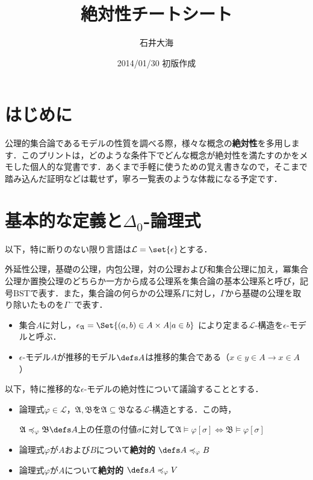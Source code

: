 \documentclass[xelatex,a4j,jadriver=standard]{bxjsarticle}
\title{絶対性チートシート}
\author{石井大海}
\date{2014/01/30 初版作成}
\newcommand*{\BST}{\mathrm{BST}}
\begin{document}
\maketitle

\section{はじめに}
公理的集合論であるモデルの性質を調べる際，様々な概念の{\bfseries 絶対性}を多用します．このプリントは，どのような条件下でどんな概念が絶対性を満たすのかをメモした個人的な覚書です．あくまで手軽に使うための覚え書きなので，そこまで踏み込んだ証明などは載せず，寧ろ一覧表のような体裁になる予定です．

\section{基本的な定義と$\Delta_0$-論理式}
以下，特に断りのない限り言語は$\mathcal{L} = \set{\epsilon}$とする．

\begin{definition}
 外延性公理，基礎の公理，内包公理，対の公理および和集合公理に加え，冪集合公理か置換公理のどちらか一方から成る公理系を集合論の基本公理系と呼び，記号$\BST$で表す．また，集合論の何らかの公理系$\Gamma$に対し，$\Gamma$から基礎の公理を取り除いたものを$\Gamma^-$で表す．
\end{definition}

\begin{definition}
\begin{itemize}
 \item 集合$A$に対し，$\epsilon_{{\mathfrak{A}}} = \Set{ (a, b) \in A \times A | a \in b}$ により定まる$\mathcal{L}$-構造を$\epsilon$-モデルと呼ぶ．
 \item $\epsilon$-モデル$A$が推移的モデル$\defs A$は推移的集合である（$x \in y \in A \rightarrow x \in A$）
\end{itemize}
\end{definition}

以下，特に推移的な$\epsilon$-モデルの絶対性について議論することとする．

\begin{definition}[絶対性]
 \begin{itemize}
  \item 論理式$\varphi \in \mathcal{L}$，$\mathfrak{A}, \mathfrak{B}$を$\mathfrak{A} \subseteq \mathfrak{B}$なる$\mathcal{L}$-構造とする．この時，
	
	$\mathfrak{A} \preccurlyeq_\varphi \mathfrak{B} \defs A$上の任意の付値$\sigma$に対して$\mathfrak{A} \models \varphi[\sigma] \Leftrightarrow \mathfrak{B} \models \varphi[\sigma]$
  \item 論理式$\varphi$が$A$および$B$について{\bfseries 絶対的} $\defs A \preccurlyeq_\varphi B$
  \item 論理式$\varphi$が$A$について{\bfseries 絶対的} $\defs A \preccurlyeq_\varphi V$
 \end{itemize}
\end{definition}
\end{document}

